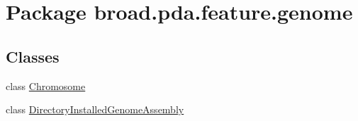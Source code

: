 \hypertarget{namespacebroad_1_1pda_1_1feature_1_1genome}{\section{Package broad.\+pda.\+feature.\+genome}
\label{namespacebroad_1_1pda_1_1feature_1_1genome}
}
\subsection*{Classes}
\begin{DoxyCompactItemize}
\item 
class \hyperlink{classbroad_1_1pda_1_1feature_1_1genome_1_1_chromosome}{Chromosome}
\item 
class \hyperlink{classbroad_1_1pda_1_1feature_1_1genome_1_1_directory_installed_genome_assembly}{Directory\+Installed\+Genome\+Assembly}
\end{DoxyCompactItemize}
